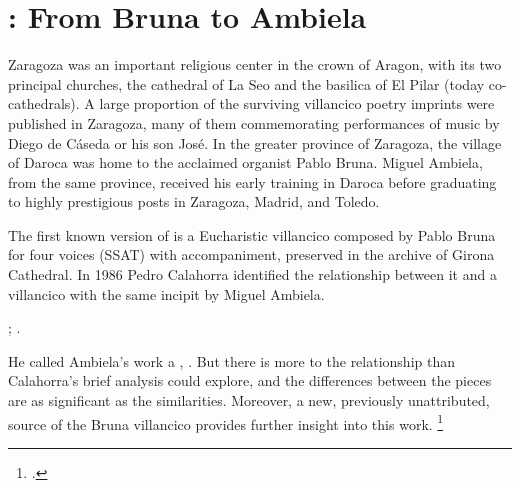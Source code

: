 

\section{: From Bruna to Ambiela}

Zaragoza was an important religious center in the crown of Aragon, with its two
principal churches, the cathedral of La Seo and the basilica of El Pilar (today
co-cathedrals).%
    \Autocite{Ezquerro:CatalogoZaragoza}
A large proportion of the surviving villancico poetry imprints were published
in Zaragoza, many of them commemorating performances of music by Diego de
Cáseda or his son José.
In the greater province of Zaragoza, the village of Daroca was home to the
acclaimed organist Pablo Bruna.  
Miguel Ambiela, from the same province, received his early training in Daroca
before graduating to highly prestigious posts in Zaragoza, Madrid, and Toledo.


The first known version of  is a Eucharistic
villancico composed by Pablo Bruna for four voices (SSAT) with accompaniment,
preserved in the archive of Girona Cathedral.%
    \Autocites
    [29--34 (no archival signature given)]{Calahorra:DarocaEdition}
In 1986 Pedro Calahorra identified the relationship between it and a 
villancico with the same incipit by Miguel Ambiela.%
\begin{Footnote}
    ; 
    \autocites
    {Calahorra:Suban}
    [35--45]{Calahorra:DarocaEdition}.
\end{Footnote}
He called Ambiela's work a , .%
    \Autocite[9]{Calahorra:Suban}
But there is more to the relationship than Calahorra's brief analysis could
explore, and the differences between the pieces are as significant as the
similarities.
Moreover, a new, previously unattributed, source of the Bruna villancico
provides further insight into this work.%
    \footnote{.}


